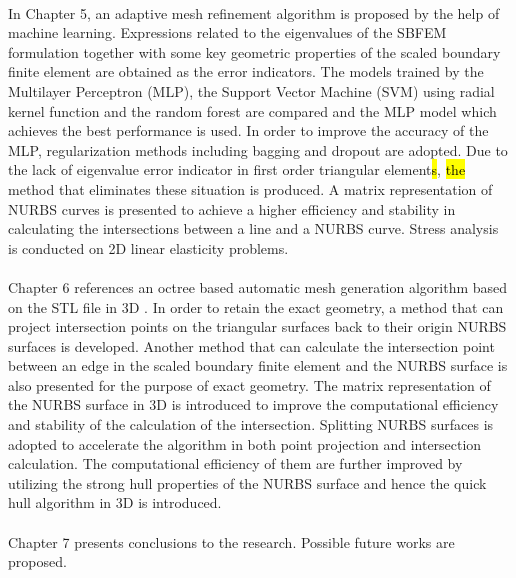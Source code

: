 \paragraph{}
In Chapter 5, an adaptive mesh refinement algorithm is proposed by the help of machine learning.
Expressions related to the eigenvalues of the SBFEM formulation together with some key geometric properties of the scaled boundary finite element are obtained as the error indicators.
The models trained by the Multilayer Perceptron (MLP), the Support Vector Machine (SVM) using radial kernel function and the random forest are compared and the MLP model which achieves the best performance is used.
In order to improve the accuracy of the MLP, regularization methods including bagging and dropout are adopted.
Due to the lack of eigenvalue error indicator in first order triangular element\hl{s}, \hl{the} method that eliminates these situation is produced.
A matrix representation of NURBS curves is presented to achieve a higher efficiency and stability in calculating the intersections between a line and a NURBS curve.
Stress analysis is conducted on 2D linear elasticity problems.

\paragraph{}
Chapter 6 references an octree based automatic mesh generation algorithm based on the STL file in 3D \citep{Liu2017}.
In order to retain the exact geometry, a method that can project intersection points on the triangular surfaces back to their origin NURBS surfaces is developed.
Another method that can calculate the intersection point between an edge in the scaled boundary finite element and the NURBS surface is also presented for the purpose of exact geometry.
The matrix representation of the NURBS surface in 3D is introduced to improve the computational efficiency and stability of the calculation of the intersection.
Splitting NURBS surfaces is adopted to accelerate the algorithm in both point projection and intersection calculation.
The computational efficiency of them are further improved by utilizing the strong hull properties of the NURBS surface and hence the quick hull algorithm in 3D is introduced.

\paragraph{}
Chapter 7 presents conclusions to the research.
Possible future works are proposed.